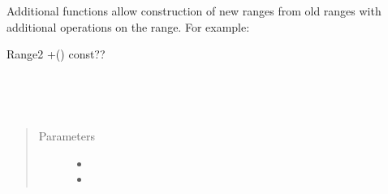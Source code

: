 \documentclass[letterpaper,10pt,english]{sphinxmanual}
\begin{document}
Additional functions allow construction of new ranges from old ranges
with additional operations on the range. For example:

\begin{sphinxVerbatim}[commandchars=\\\{\}]
Range\PYGZlt{}2\PYGZgt{} +() const??
\end{sphinxVerbatim}

\begin{fulllineitems}
\label{\detokenize{programming-interface/parallelism/range:_CPPv4I_iE5range}}%
\pysigstartmultiline
{}%
\pysigstopmultiline~

\begin{fulllineitems}
\label{\detokenize{programming-interface/parallelism/range:_CPPv4N5range5rangeE6size_t}}%
\pysigstartmultiline
{}%
\pysigstopmultiline{}\label{\detokenize{programming-interface/parallelism/range:_CPPv4N5range5rangeE6size_t6size_t}}%
\pysigstartmultiline
{}%
\pysigstopmultiline{}\label{\detokenize{programming-interface/parallelism/range:_CPPv4N5range5rangeE6size_t6size_t6size_t}}%
\pysigstartmultiline
{}%
\pysigstopmultiline~\begin{quote}\begin{description}
\item[{Parameters}] \leavevmode\begin{itemize}
\item {} 
 \textendash{} 

\item {} 
 \textendash{} 


\end{itemize}
\end{description}
\end{quote}
\end{fulllineitems}
\end{fulllineitems}
\end{document}
